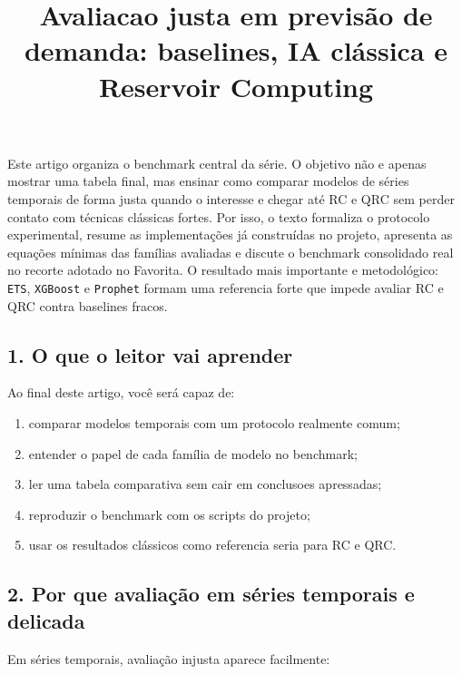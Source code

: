 \documentclass[12pt]{article}
\title{Avaliacao justa em previsão de demanda: baselines, IA clássica e Reservoir Computing}
\author{}
\providecommand{\tightlist}{%
          \setlength{\itemsep}{0pt}\setlength{\parskip}{0pt}}
\begin{document}
        \maketitle

        \begin{resumo}
        Este artigo organiza o benchmark central da série. O objetivo não e apenas mostrar uma tabela final, mas ensinar como comparar modelos de séries temporais de forma justa quando o interesse e chegar até RC e QRC sem perder contato com técnicas clássicas fortes. Por isso, o texto formaliza o protocolo experimental, resume as implementações já construídas no projeto, apresenta as equações mínimas das famílias avaliadas e discute o benchmark consolidado real no recorte adotado no Favorita. O resultado mais importante e metodológico: \texttt{ETS}, \texttt{XGBoost} e \texttt{Prophet} formam uma referencia forte que impede avaliar RC e QRC contra baselines fracos.
        \end{resumo}

        \subsection{1. O que o leitor vai aprender}\label{1-o-que-o-leitor-vai-aprender}

Ao final deste artigo, você será capaz de:

\begin{enumerate}
\def\labelenumi{\arabic{enumi}.}
\tightlist
\item
  comparar modelos temporais com um protocolo realmente comum;
\item
  entender o papel de cada família de modelo no benchmark;
\item
  ler uma tabela comparativa sem cair em conclusoes apressadas;
\item
  reproduzir o benchmark com os scripts do projeto;
\item
  usar os resultados clássicos como referencia seria para RC e QRC.
\end{enumerate}

\subsection{2. Por que avaliação em séries temporais e delicada}\label{2-por-que-avaliauxe7uxe3o-em-suxe9ries-temporais-e-delicada}

Em séries temporais, avaliação injusta aparece facilmente:
\end{document}
